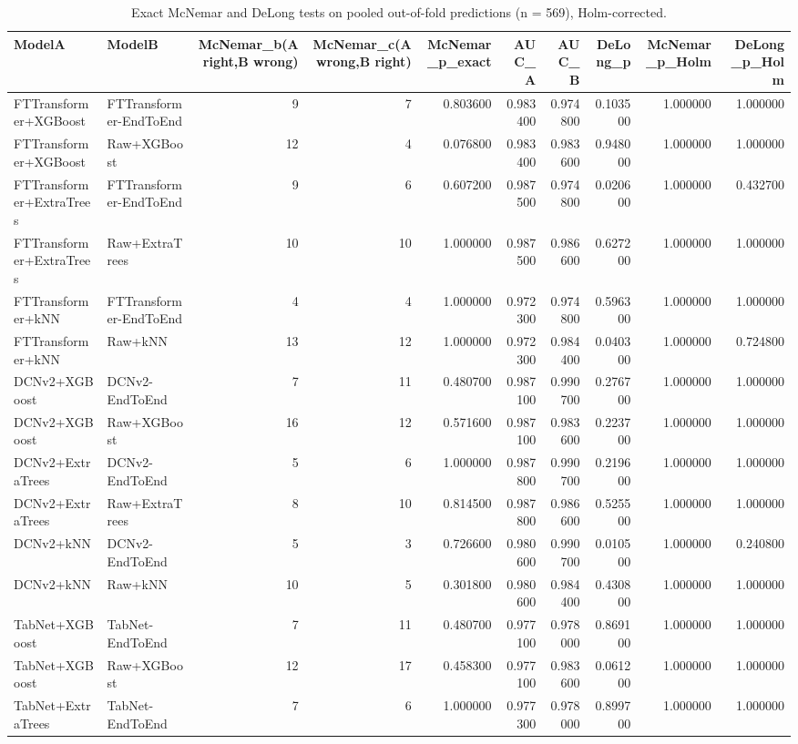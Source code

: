 \begin{table}
\caption{Exact McNemar and DeLong tests on pooled out-of-fold predictions (n = 569), Holm-corrected.}
\label{tab:stats}
\begin{tabular}{llrrrrrrrr}
\toprule
ModelA & ModelB & McNemar\_b(A right,B wrong) & McNemar\_c(A wrong,B right) & McNemar\_p\_exact & AUC\_A & AUC\_B & DeLong\_p & McNemar\_p\_Holm & DeLong\_p\_Holm \\
\midrule
FTTransformer+XGBoost & FTTransformer-EndToEnd & 9 & 7 & 0.803600 & 0.983400 & 0.974800 & 0.103500 & 1.000000 & 1.000000 \\
FTTransformer+XGBoost & Raw+XGBoost & 12 & 4 & 0.076800 & 0.983400 & 0.983600 & 0.948000 & 1.000000 & 1.000000 \\
FTTransformer+ExtraTrees & FTTransformer-EndToEnd & 9 & 6 & 0.607200 & 0.987500 & 0.974800 & 0.020600 & 1.000000 & 0.432700 \\
FTTransformer+ExtraTrees & Raw+ExtraTrees & 10 & 10 & 1.000000 & 0.987500 & 0.986600 & 0.627200 & 1.000000 & 1.000000 \\
FTTransformer+kNN & FTTransformer-EndToEnd & 4 & 4 & 1.000000 & 0.972300 & 0.974800 & 0.596300 & 1.000000 & 1.000000 \\
FTTransformer+kNN & Raw+kNN & 13 & 12 & 1.000000 & 0.972300 & 0.984400 & 0.040300 & 1.000000 & 0.724800 \\
DCNv2+XGBoost & DCNv2-EndToEnd & 7 & 11 & 0.480700 & 0.987100 & 0.990700 & 0.276700 & 1.000000 & 1.000000 \\
DCNv2+XGBoost & Raw+XGBoost & 16 & 12 & 0.571600 & 0.987100 & 0.983600 & 0.223700 & 1.000000 & 1.000000 \\
DCNv2+ExtraTrees & DCNv2-EndToEnd & 5 & 6 & 1.000000 & 0.987800 & 0.990700 & 0.219600 & 1.000000 & 1.000000 \\
DCNv2+ExtraTrees & Raw+ExtraTrees & 8 & 10 & 0.814500 & 0.987800 & 0.986600 & 0.525500 & 1.000000 & 1.000000 \\
DCNv2+kNN & DCNv2-EndToEnd & 5 & 3 & 0.726600 & 0.980600 & 0.990700 & 0.010500 & 1.000000 & 0.240800 \\
DCNv2+kNN & Raw+kNN & 10 & 5 & 0.301800 & 0.980600 & 0.984400 & 0.430800 & 1.000000 & 1.000000 \\
TabNet+XGBoost & TabNet-EndToEnd & 7 & 11 & 0.480700 & 0.977100 & 0.978000 & 0.869100 & 1.000000 & 1.000000 \\
TabNet+XGBoost & Raw+XGBoost & 12 & 17 & 0.458300 & 0.977100 & 0.983600 & 0.061200 & 1.000000 & 1.000000 \\
TabNet+ExtraTrees & TabNet-EndToEnd & 7 & 6 & 1.000000 & 0.977300 & 0.978000 & 0.899700 & 1.000000 & 1.000000 \\

\end{tabular}
\end{table}
